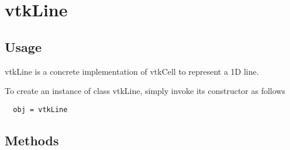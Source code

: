 \section{vtkLine}

\subsection{Usage}

 vtkLine is a concrete implementation of vtkCell to represent a 1D line.

To create an instance of class vtkLine, simply
invoke its constructor as follows
\begin{verbatim}
  obj = vtkLine
\end{verbatim}
\subsection{Methods}

